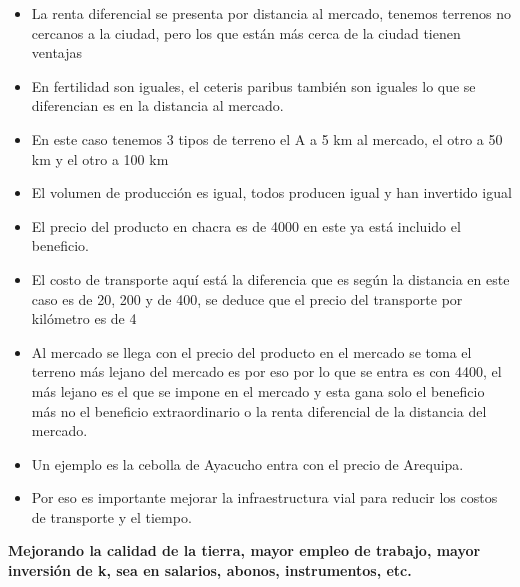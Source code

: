 \documentclass[
  a4paper,
]{article}
\begin{document}
\begin{itemize}
\item
  La renta diferencial se presenta por distancia al mercado, tenemos
  terrenos no cercanos a la ciudad, pero los que están más cerca de la
  ciudad tienen ventajas
\item
  En fertilidad son iguales, el ceteris paribus también son iguales lo
  que se diferencian es en la distancia al mercado.
\item
  En este caso tenemos 3 tipos de terreno el A a 5 km al mercado, el
  otro a 50 km y el otro a 100 km
\item
  El volumen de producción es igual, todos producen igual y han
  invertido igual
\item
  El precio del producto en chacra es de 4000 en este ya está incluido
  el beneficio.
\item
  El costo de transporte aquí está la diferencia que es según la
  distancia en este caso es de 20, 200 y de 400, se deduce que el precio
  del transporte por kilómetro es de 4
\item
  Al mercado se llega con el precio del producto en el mercado se toma
  el terreno más lejano del mercado es por eso por lo que se entra es
  con 4400, el más lejano es el que se impone en el mercado y esta gana
  solo el beneficio más no el beneficio extraordinario o la renta
  diferencial de la distancia del mercado.
\item
  Un ejemplo es la cebolla de Ayacucho entra con el precio de Arequipa.
\item
  Por eso es importante mejorar la infraestructura vial para reducir los
  costos de transporte y el tiempo.
\end{itemize}

\textbf{Mejorando la calidad de la tierra, mayor empleo de trabajo,
mayor inversión de k, sea en salarios, abonos, instrumentos, etc.}
\end{document}
